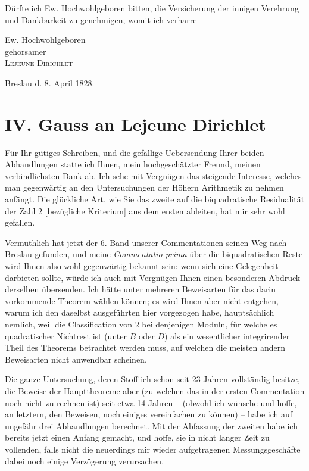 \documentclass[11pt]{article}
\newcommand{\scn}[1]{\textsc{#1}}
\begin{document}
Dürfte ich Ew. Hochwohlgeboren bitten, die Versicherung der innigen Verehrung und Dankbarkeit zu genehmigen, womit ich verharre

\begin{flushright}
Ew. Hochwohlgeboren\\
gehorsamer\\
\scn{Lejeune Dirichlet}
\end{flushright}
Breslau d. 8. April 1828.

\section*{IV. Gauss an Lejeune Dirichlet}

Für Ihr gütiges Schreiben, und die gefällige Uebersendung Ihrer beiden Abhandlungen statte ich Ihnen, mein hochgeschätzter Freund, meinen verbindlichsten Dank ab. Ich sehe mit Vergnügen das steigende Interesse, welches man gegenwärtig an den Untersuchungen der Höhern Arithmetik zu nehmen anfängt. Die glückliche Art, wie Sie das zweite auf die biquadratische Residualität der Zahl $2$ [bezügliche Kriterium] aus dem ersten ableiten, hat mir sehr wohl gefallen.

Vermuthlich hat jetzt der 6. Band unserer Commentationen seinen Weg nach Breslau gefunden, und meine \emph{Commentatio prima} über die biquadratischen Reste wird Ihnen also wohl gegenwärtig bekannt sein: wenn sich eine Gelegenheit darbieten sollte, würde ich auch mit Vergnügen Ihnen einen besonderen Abdruck derselben übersenden. Ich hätte unter mehreren Beweisarten für das darin vorkommende Theorem wählen können; es wird Ihnen aber nicht entgehen, warum ich den daselbst ausgeführten hier vorgezogen habe, hauptsächlich nemlich, weil die Classification von $2$ bei denjenigen Moduln, für welche es quadratischer Nichtrest ist (unter $B$ oder $D$) als ein wesentlicher integrirender Theil des Theorems betrachtet werden muss, auf welchen die meisten andern Beweisarten nicht anwendbar scheinen.

Die ganze Untersuchung, deren Stoff ich schon seit 23 Jahren vollständig besitze, die Beweise der Haupttheoreme aber (zu welchen das in der ersten Commentation noch nicht zu rechnen ist) seit etwa 14 Jahren -- (obwohl ich wünsche und hoffe, an letztern, den Beweisen, noch einiges vereinfachen zu können) -- habe ich auf ungefähr drei Abhandlungen berechnet. Mit der Abfassung der zweiten habe ich bereits jetzt einen Anfang gemacht, und hoffe, sie in nicht langer Zeit zu vollenden, falls nicht die neuerdings mir wieder aufgetragenen Messungsgeschäfte dabei noch einige Verzögerung verursachen.
\end{document}
